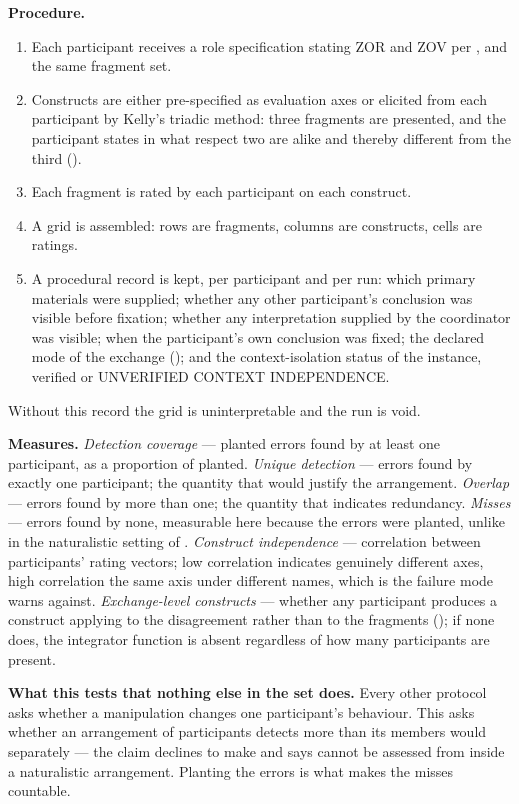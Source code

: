 \textbf{Procedure.}

\begin{enumerate}
  \item Each participant receives a role specification stating ZOR and ZOV per , and the same fragment set.
  \item Constructs are either pre-specified as evaluation axes or elicited from each participant by Kelly's triadic method: three fragments are presented, and the participant states in what respect two are alike and thereby different from the third ().
  \item Each fragment is rated by each participant on each construct.
  \item A grid is assembled: rows are fragments, columns are constructs, cells are ratings.
  \item A procedural record is kept, per participant and per run: which primary materials were supplied; whether any other participant's conclusion was visible before fixation; whether any interpretation supplied by the coordinator was visible; when the participant's own conclusion was fixed; the declared mode of the exchange (); and the context-isolation status of the instance, verified or UNVERIFIED CONTEXT INDEPENDENCE.
\end{enumerate}
Without this record the grid is uninterpretable and the run is void.

\textbf{Measures.} \emph{Detection coverage} — planted errors found by at least one participant, as a proportion of planted. \emph{Unique detection} — errors found by exactly one participant; the quantity that would justify the arrangement. \emph{Overlap} — errors found by more than one; the quantity that indicates redundancy. \emph{Misses} — errors found by none, measurable here because the errors were planted, unlike in the naturalistic setting of . \emph{Construct independence} — correlation between participants' rating vectors; low correlation indicates genuinely different axes, high correlation the same axis under different names, which is the failure mode  warns against. \emph{Exchange-level constructs} — whether any participant produces a construct applying to the disagreement rather than to the fragments (); if none does, the integrator function is absent regardless of how many participants are present.

\textbf{What this tests that nothing else in the set does.} Every other protocol asks whether a manipulation changes one participant's behaviour. This asks whether an arrangement of participants detects more than its members would separately — the claim  declines to make and  says cannot be assessed from inside a naturalistic arrangement. Planting the errors is what makes the misses countable.

